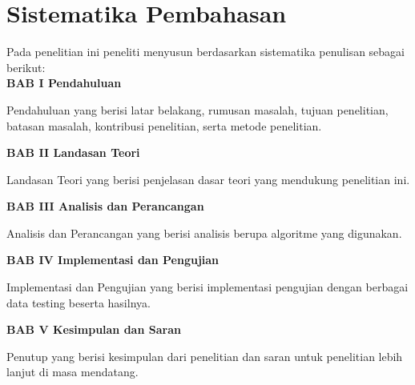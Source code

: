 \section{Sistematika Pembahasan}
\noindent Pada penelitian ini peneliti menyusun berdasarkan sistematika penulisan sebagai berikut: \\[0.5cm]
\noindent \textbf{BAB I \hspace{1cm} Pendahuluan}
\begin{addmargin}[2.35cm]{0em}
Pendahuluan yang berisi latar belakang, rumusan masalah, tujuan penelitian, batasan masalah, kontribusi penelitian, serta metode penelitian.
\end{addmargin}
\noindent \textbf{BAB II \hspace{0.8cm} Landasan Teori}
\begin{addmargin}[2.35cm]{0em}
Landasan Teori yang berisi penjelasan dasar teori yang mendukung penelitian ini.
\end{addmargin}
\noindent \textbf{BAB III \hspace{0.7cm} Analisis dan Perancangan}
\begin{addmargin}[2.35cm]{0em}
Analisis dan Perancangan yang berisi analisis berupa algoritme yang digunakan.
\end{addmargin}
\noindent \textbf{BAB IV \hspace{0.7cm} Implementasi dan Pengujian}
\begin{addmargin}[2.35cm]{0em}
Implementasi dan Pengujian yang berisi implementasi pengujian dengan berbagai data testing beserta hasilnya.
\end{addmargin}
\noindent \textbf{BAB V \hspace{0.8cm} Kesimpulan dan Saran}
\begin{addmargin}[2.35cm]{0em}
Penutup yang berisi kesimpulan dari penelitian dan saran untuk penelitian lebih lanjut di masa mendatang.
\end{addmargin}

\newpage